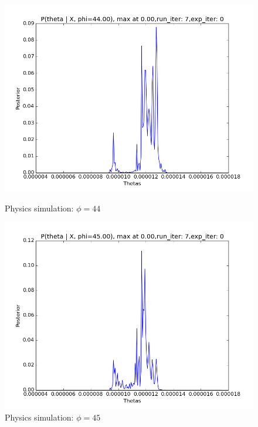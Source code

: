 \documentclass[10pt,journal,compsoc]{IEEEtran}
\begin{document}
\begin{figure}[ht!]
\begin{minipage}[b]{0.5\linewidth}
\includegraphics[width=1\linewidth]{PhysicsPlots/LP4.png} 
\caption{\label{fig:LP4}Physics simulation: $\phi=44$}
\end{minipage} 		
\begin{minipage}[b]{0.5\linewidth}
\centering
\includegraphics[width=1\linewidth]{PhysicsPlots/LP5.png} 
\caption{\label{fig:LP5}Physics simulation: $\phi=45$}
\end{minipage} 
\begin{minipage}[b]{0.5\linewidth}
\centering

\end{minipage}
\end{figure}
\end{document}
